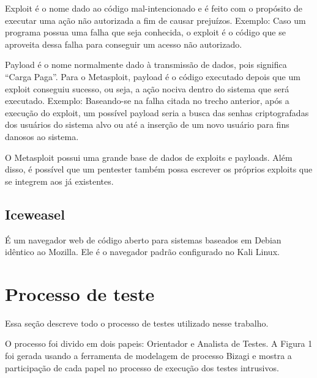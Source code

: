 \documentclass[
    12pt,               %
    openright,          %
    oneside,            %
    a4paper,            %
    section=TITLE,     %
    english,            %
    french,             %
    spanish,            %
    brazil              %
    ]{abntex2}
\newcommand{\citep}{\cite}
\begin{document}
Exploit é o nome dado ao código mal-intencionado e é feito com o propósito de executar uma ação não autorizada a fim de causar prejuízos. Exemplo: Caso um programa possua uma falha que seja conhecida, o exploit é o código que se aproveita dessa falha para conseguir um acesso não autorizado.


Payload é o nome normalmente dado à transmissão de dados, pois significa \textquotedblleft{}Carga Paga\textquotedblright{}. Para o Metasploit, payload é o código executado depois que um exploit conseguiu sucesso, ou seja, a ação nociva dentro do sistema que será executado. Exemplo: Baseando-se na falha citada no trecho anterior, após a execução do exploit, um possível payload seria a busca das senhas criptografadas dos usuários do sistema alvo ou até a inserção de um novo usuário para fins danosos ao sistema.


O Metasploit possui uma grande base de dados de exploits e payloads\citep{62204}. Além disso, é possível que um pentester também possa escrever os próprios exploits que se integrem aos já existentes.~\citep{62225}



\subsection*{Iceweasel}

É um navegador web de código aberto para sistemas baseados em Debian idêntico ao Mozilla. Ele é o navegador padrão configurado no Kali Linux.



\section{Processo de teste}

Essa seção descreve todo o processo de testes utilizado nesse trabalho.


O processo foi divido em dois papeis: Orientador e Analista de Testes. A Figura 1 foi gerada usando a ferramenta de modelagem de processo Bizagi e mostra a participação de cada papel no processo de execução dos testes intrusivos.
\end{document}
